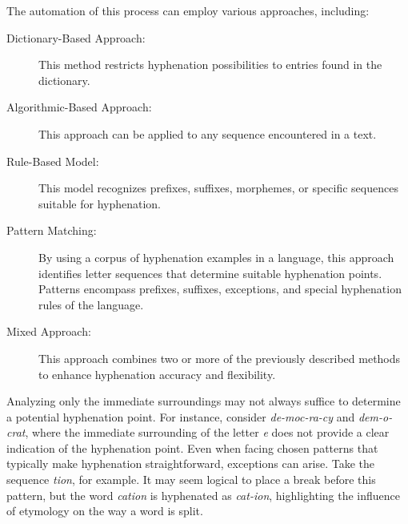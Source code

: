 \documentclass{article}
\begin{document}

The automation of this process can employ various approaches, including:
\begin{description}
\item[Dictionary-Based Approach:] This method restricts hyphenation
    possibilities to entries found in the dictionary.
\item[Algorithmic-Based Approach:] This approach can be applied to any sequence
    encountered in a text.
\item[Rule-Based Model:] This model recognizes prefixes, suffixes, morphemes,
    or specific sequences suitable for hyphenation.
\item[Pattern Matching:] By using a corpus of hyphenation examples in a
    language, this approach identifies letter sequences that determine suitable
    hyphenation points. Patterns encompass prefixes, suffixes, exceptions, and
    special hyphenation rules of the language.
\item[Mixed Approach:] This approach combines two or more of the previously
    described methods to enhance hyphenation accuracy and flexibility.
\end{description}

Analyzing only the immediate surroundings may not always suffice to determine a
potential hyphenation point. For instance, consider \emph{de-moc-ra-cy} and \emph{dem-o-crat},
where the immediate surrounding of the letter \emph{e} does not provide a clear
indication of the hyphenation point. 
Even when facing chosen patterns that typically make hyphenation
straightforward, exceptions can arise. Take the sequence \emph{tion}, for example.
It may seem logical to place a break before this pattern, but the word \emph{cation}
is hyphenated as \emph{cat-ion}, highlighting the influence of etymology on the way
a word is split.
\end{document}
